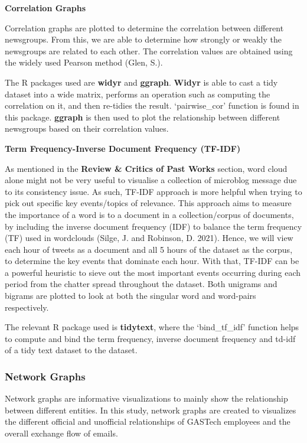 \documentclass{acm_proc_article-sp}
\begin{document}
\textbf{Correlation Graphs}

Correlation graphs are plotted to determine the correlation between
different newsgroups. From this, we are able to determine how strongly
or weakly the newsgroups are related to each other. The correlation
values are obtained using the widely used Pearson method (Glen, S.).

The R packages used are \textbf{widyr} and \textbf{ggraph}.
\textbf{Widyr} is able to cast a tidy dataset into a wide matrix,
performs an operation such as computing the correlation on it, and then
re-tidies the result. `pairwise\_cor' function is found in this package.
\textbf{ggraph} is then used to plot the relationship between different
newsgroups based on their correlation values.

\textbf{Term Frequency-Inverse Document Frequency (TF-IDF)}

As mentioned in the \textbf{Review \& Critics of Past Works} section,
word cloud alone might not be very useful to visualise a collection of
microblog message due to its consistency issue. As such, TF-IDF approach
is more helpful when trying to pick out specific key events/topics of
relevance. This approach aims to measure the importance of a word is to
a document in a collection/corpus of documents, by including the inverse
document frequency (IDF) to balance the term frequency (TF) used in
wordclouds (Silge, J. and Robinson, D. 2021). Hence, we will view each
hour of tweets as a document and all 5 hours of the dataset as the
corpus, to determine the key events that dominate each hour. With that,
TF-IDF can be a powerful heuristic to sieve out the most important
events occurring during each period from the chatter spread throughout
the dataset. Both unigrams and bigrams are plotted to look at both the
singular word and word-pairs respectively.

The relevant R package used is \textbf{tidytext}, where the
`bind\_tf\_idf' function helps to compute and bind the term frequency,
inverse document frequency and td-idf of a tidy text dataset to the
dataset.

\hypertarget{network-graphs-1}{%
\subsubsection{Network Graphs}\label{network-graphs-1}}

Network graphs are informative visualizations to mainly show the
relationship between different entities. In this study, network graphs
are created to visualizes the different official and unofficial
relationships of GASTech employees and the overall exchange flow of
emails.
\end{document}
